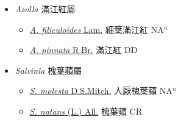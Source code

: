 
  \begin{itemize}
 \item[] \textit{Azolla} 滿江紅屬
                    
  \begin{itemize}
        \item[] \href{http://www.theplantlist.org/tpl1.1/search?q=Azolla+filiculoides}{\textit{A. filiculoides} Lam.}   細葉滿江紅 NA$^n$
        \item[] \href{http://www.theplantlist.org/tpl1.1/search?q=Azolla+pinnata}{\textit{A. pinnata} R.Br.}   滿江紅 DD
  \end{itemize}
 \item[] \textit{Salvinia} 槐葉蘋屬
                    
  \begin{itemize}
        \item[] \href{http://www.theplantlist.org/tpl1.1/search?q=Salvinia+molesta}{\textit{S. molesta} D.S.Mitch.}   人厭槐葉蘋 NA$^n$
        \item[] \href{http://www.theplantlist.org/tpl1.1/search?q=Salvinia+natans}{\textit{S. natans} (L.) All.}   槐葉蘋 CR
  \end{itemize}
  \end{itemize}
